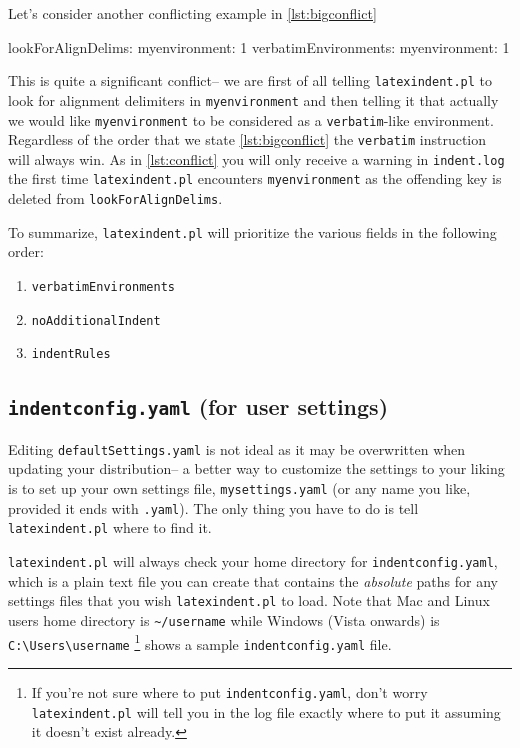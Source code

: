 Let's consider another conflicting example in \cref{lst:bigconflict}
\begin{yaml}[caption={More conflicting ideas},label={lst:bigconflict}]
lookForAlignDelims:
   myenvironment: 1
verbatimEnvironments:
   myenvironment: 1
\end{yaml}
This is quite a significant conflict-- we are first of all telling \lstinline!latexindent.pl!
to look for alignment delimiters in \lstinline!myenvironment! and then 
telling it that actually we would like \lstinline!myenvironment! to be considered 
as a \lstinline!verbatim!-like environment. Regardless of the order that we 
state \cref{lst:bigconflict} the \lstinline!verbatim! instruction will always win.
As in \cref{lst:conflict} you will only receive a warning in \lstinline!indent.log! the 
first time \lstinline!latexindent.pl! encounters \lstinline!myenvironment! as the 
offending key is deleted from \lstinline!lookForAlignDelims!.
 	 	 	 	 	
To summarize, \lstinline!latexindent.pl! will prioritize the various fields in the 
following order:
\begin{enumerate}
	\item \lstinline!verbatimEnvironments!
	\item \lstinline!noAdditionalIndent!
	\item \lstinline!indentRules!
\end{enumerate}
\subsection{\lstinline!indentconfig.yaml! (for user settings)}\label{sec:indentconfig}
Editing \lstinline!defaultSettings.yaml! is not ideal as it may be overwritten when 
updating your distribution-- a better way to customize the settings to your liking 
is to set up your own settings file, 
\lstinline!mysettings.yaml! (or any name you like, provided it ends with \lstinline!.yaml!). 
The only thing you have to do is tell \lstinline!latexindent.pl! where to find it. 
 	 	 	 	 	
\lstinline!latexindent.pl! will always check your home directory for \lstinline!indentconfig.yaml!, 
which is a plain text file you can create that contains the \emph{absolute}
paths for any settings files that you wish \lstinline!latexindent.pl! to load.
Note that Mac and Linux users home directory is \lstinline!~/username! while
Windows (Vista onwards) is \lstinline!C:\Users\username! \footnote{If you're not sure 
	where to put \lstinline!indentconfig.yaml!, don't 
	worry \lstinline!latexindent.pl! will tell you in the log file exactly where to 
put it assuming it doesn't exist already.}
 shows a sample \lstinline!indentconfig.yaml! file.
 	 	 	 	 	
